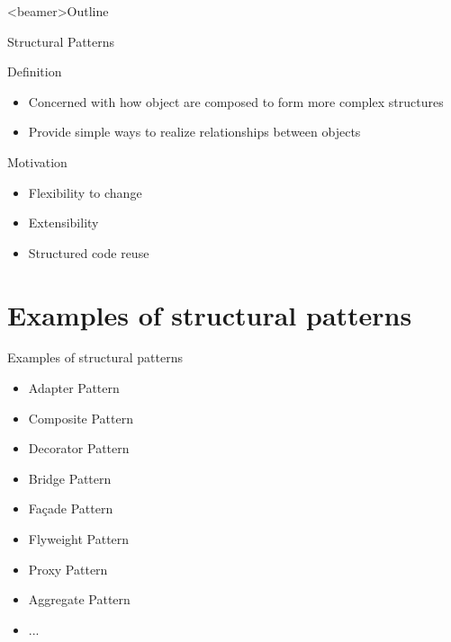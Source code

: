 \documentclass{beamer}
\begin{document}
\begin{frame}<beamer>{Outline}
  \tableofcontents[currentsection]
\end{frame}


\begin{frame}{Structural Patterns}
 \begin{block}{Definition}
 \begin{itemize}
   \item {Concerned with how object are composed to form more complex structures}
   \item {Provide simple ways to realize relationships between objects}
 \end{itemize}
 \end{block}
 \pause
 \begin{block}{Motivation}
 \begin{itemize}
   \item {Flexibility to change}
   \item {Extensibility}
   \item {Structured code reuse}
 \end{itemize}
 \end{block}
\end{frame}

\section{Examples of structural patterns}

\begin{frame}{Examples of structural patterns}
  \begin{itemize}
   \item {
    Adapter Pattern
  }
  \item {   
    Composite Pattern
  }
  \item {
    Decorator Pattern
  }
  \item {
    Bridge Pattern
  }
  \item {
    Fa\c{c}ade Pattern
  }
  \item {
    Flyweight Pattern
  }
  \item {
    Proxy Pattern
  }
  \item {
    Aggregate Pattern
  }
   \item {
    ...
  }
  \end{itemize}
\end{frame}
\end{document}
